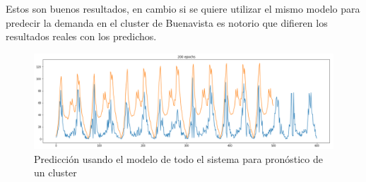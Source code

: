 \documentclass[12pt,spanish]{article}
\begin{document}
	Estos son buenos resultados, en cambio si se quiere utilizar el mismo modelo para predecir la demanda en el cluster de Buenavista es notorio que difieren los resultados reales con los predichos.
	\begin{figure}[H]
		\centering
		\includegraphics[width=15cm]{Imagenes/model_predict_buenavista_cluster.PNG}
		\begin{centering}
			\caption{Predicción usando el modelo de todo el sistema para pronóstico de un cluster}
		\end{centering}
	\end{figure}
	\newpage
\end{document}
